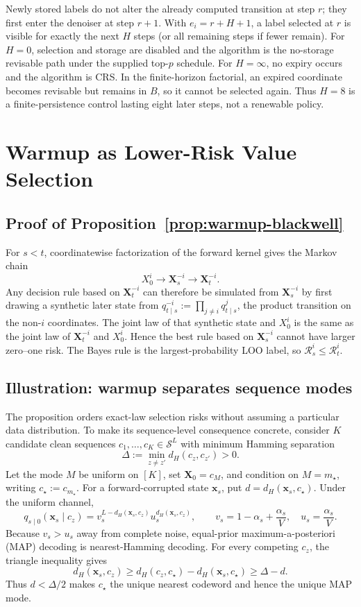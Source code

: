 \documentclass{article}
\newcommand{\1}{\mathbf 1}
\newcommand{\CRS}{\textsc{CRS}}
\theoremstyle{definition}
\begin{document}
Newly stored labels do not alter the already computed transition at step $r$;
they first enter the denoiser at step $r+1$. With $e_i=r+H+1$, a label selected
at $r$ is visible for exactly the next $H$ steps (or all remaining steps if
fewer remain). For $H=0$, selection and storage are disabled and the algorithm
is the no-storage revisable path under the supplied top-$p$ schedule. For
$H=\infty$, no expiry occurs and the
algorithm is \CRS. In the finite-horizon factorial, an expired
coordinate becomes revisable but remains in $B$, so it cannot be selected
again. Thus $H=8$ is a finite-persistence control lasting eight later steps, not a
renewable policy.

\FloatBarrier

\section{Warmup as Lower-Risk Value Selection}
\label{app:warmup-theory}

\subsection{Proof of Proposition~\ref{prop:warmup-blackwell}}
\label{app:warmup-proposition-proof}

For $s<t$, coordinatewise factorization of the forward kernel gives the
Markov chain
\[
 X_0^i\longrightarrow\bm X_s^{-i}\longrightarrow\bm X_t^{-i}.
\]
Any decision rule based on $\bm X_t^{-i}$ can therefore be simulated from
$\bm X_s^{-i}$ by first drawing a synthetic later state from
$q_{t\mid s}^{-i}:=\prod_{j\ne i}q_{t\mid s}^j$, the product transition on
the non-$i$ coordinates. The joint law of that synthetic state and $X_0^i$ is the
same as the joint law of $\bm X_t^{-i}$ and $X_0^i$. Hence the best rule based
on $\bm X_s^{-i}$ cannot have larger zero--one risk. The Bayes rule is the
largest-probability LOO label, so
$\mathcal R_s^i\le\mathcal R_t^i$.

\subsection{Illustration: warmup separates sequence modes}
\label{app:warmup-codebook}

The proposition orders exact-law selection risks without assuming a particular
data distribution. To make its sequence-level consequence concrete, consider
$K$ candidate clean sequences $c_1,\ldots,c_K\in\mathcal S^L$ with minimum
Hamming separation
\[
 \Delta:=\min_{z\ne z'}d_H(c_z,c_{z'})>0.
\]
Let the mode $M$ be uniform on $[K]$, set $\bm X_0=c_M$, and condition on
$M=m_\star$, writing $c_\star:=c_{m_\star}$. For a forward-corrupted state
$\bm x_s$, put $d=d_H(\bm x_s,c_\star)$. Under the uniform channel,
\[
 q_{s\mid0}(\bm x_s\mid c_z)
 =v_s^{L-d_H(\bm x_s,c_z)}u_s^{d_H(\bm x_s,c_z)},
 \qquad
 v_s=1-\alpha_s+\frac{\alpha_s}{V},
 \quad u_s=\frac{\alpha_s}{V}.
\]
Because $v_s>u_s$ away from complete noise, equal-prior
maximum-a-posteriori (MAP) decoding is nearest-Hamming decoding. For every
competing $c_z$, the triangle inequality gives
\[
 d_H(\bm x_s,c_z)
 \ge d_H(c_z,c_\star)-d_H(\bm x_s,c_\star)
 \ge\Delta-d.
\]
Thus $d<\Delta/2$ makes $c_\star$ the unique nearest codeword and hence the
unique MAP mode.
\end{document}
